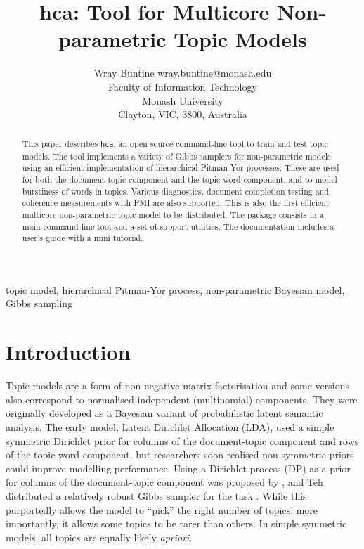 \documentclass[twoside,11pt]{article}
\begin{document}
\title{hca: Tool for Multicore Non-parametric Topic Models}

\author{\name Wray Buntine \email wray.buntine@monash.edu \\
       \addr Faculty of Information Technology \\
       Monash University\\
       Clayton, VIC, 3800, Australia}


\maketitle

\begin{abstract}%
This paper describes {\tt hca}, an open source command-line tool to
train and test topic models.  The tool implements a variety of Gibbs
samplers for non-parametric models using an efficient implementation
of hierarchical Pitman-Yor processes.  These are used for both the
document-topic component and the topic-word component, and to model
burstiness of words in topics.  Various diagnostics, document
completion testing and coherence measurements with PMI are also
supported.  This is also the first efficient multicore non-parametric topic
model to be distributed.  The package consists in a main command-line tool
and a set of support utilities. The documentation includes a user's
guide with a mini tutorial.
\end{abstract}

\begin{keywords}
  topic model, hierarchical Pitman-Yor process, non-parametric Bayesian model,
  Gibbs sampling
\end{keywords}

\section{Introduction}
Topic models are a form of non-negative matrix factorisation
and some versions also correspond to normalised independent
(multinomial) components.
They were originally developed
as a Bayesian variant of probabilistic latent semantic analysis.
The early model, Latent Dirichlet Allocation (LDA),
used a simple symmetric Dirichlet prior for columns of the
document-topic component and rows of the topic-word component, but
researchers soon realised non-symmetric priors could
improve modelling performance.  Using a Dirichlet process (DP) as a prior
for columns of the document-topic component was proposed by
\cite{TehJorBea2006}, and Teh distributed a relatively robust Gibbs
sampler for the task \cite{TehNBMM21}.  While this
purportedly allows the
model to ``pick'' the right number of topics, more importantly,
it allows some topics to be rarer than others.
In simple symmetric models, all topics are equally likely {\it apriori}.
\end{document}
